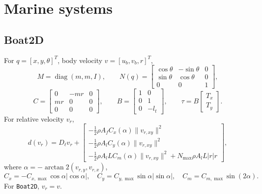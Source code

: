 \documentclass[11pt]{article}
\newcommand{\diag}{\operatorname{diag}}
\begin{document}
\section{Marine systems}

\subsection{Boat2D}
For \(q=[x,y,\theta]^T\), body velocity \(v=[u_b,v_b,r]^T\),
\begin{equation}
    M=\diag(m,m,I),
    \qquad
    N(q)=
    \begin{bmatrix}
        \cos\theta&-\sin\theta&0\\
        \sin\theta&\cos\theta&0\\
        0&0&1
    \end{bmatrix},
\end{equation}
\begin{equation}
    C=
    \begin{bmatrix}
        0&-mr&0\\
        mr&0&0\\
        0&0&0
    \end{bmatrix},
    \qquad
    B=
    \begin{bmatrix}
        1&0\\
        0&1\\
        0&-l_t
    \end{bmatrix},
    \qquad
    \tau=B\begin{bmatrix}T_x\\T_y\end{bmatrix}.
\end{equation}
For relative velocity \(v_r\),
\begin{equation}
    d(v_r)=D_{\ell}v_r+
    \begin{bmatrix}
        -\frac{1}{2}\rho A_f C_x(\alpha)\|v_{r,xy}\|^2\\
        -\frac{1}{2}\rho A_l C_y(\alpha)\|v_{r,xy}\|^2\\
        -\frac{1}{2}\rho A_l L C_m(\alpha)\|v_{r,xy}\|^2
        +N_{\max}\rho A_lL|r|r
    \end{bmatrix},
\end{equation}
where \(\alpha=-\arctan2(v_{r,y},v_{r,x})\),
\begin{equation}
    C_x=-C_{x,\max}\cos\alpha|\cos\alpha|,
    \quad
    C_y=C_{y,\max}\sin\alpha|\sin\alpha|,
    \quad
    C_m=C_{m,\max}\sin(2\alpha).
\end{equation}
For \texttt{Boat2D}, \(v_r=v\).
\end{document}
